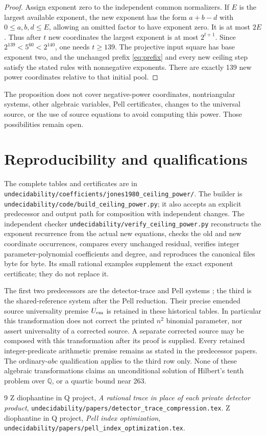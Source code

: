 \documentclass[11pt]{article}
\newcommand{\Q}{\mathbb Q}
\begin{document}
\begin{proof}
Assign exponent zero to the independent common normalizers.
If $E$ is the largest available exponent, the new exponent has the
form $a+b-d$ with $0\le a,b,d\le E$, allowing an omitted factor
to have exponent zero.  It is at most $2E$.  Thus after $t$ new
coordinates the largest exponent is at most $2^{t+1}$.  Since
$2^{139}<5^{60}<2^{140}$, one needs $t\ge139$.
The projective input square has base exponent two, and the unchanged
prefix \eqref{eq:prefix} and every new ceiling step satisfy the stated
rules with nonnegative exponents.  There are exactly 139 new power
coordinates relative to that initial pool.
\end{proof}

The proposition does not cover negative-power coordinates, nontriangular
systems, other algebraic variables, Pell certificates, changes to the
universal source, or the use of source equations to avoid computing this
power.  Those possibilities remain open.

\section{Reproducibility and qualifications}

The complete tables and certificates are in
\nolinkurl{undecidability/coefficients/jones1980_ceiling_power/}.
The builder is
\nolinkurl{undecidability/code/build_ceiling_power.py}; it also accepts
an explicit predecessor and output path for composition with independent
changes.  The independent checker
\nolinkurl{undecidability/verify_ceiling_power.py} reconstructs the exponent
recurrence from the actual new equations, checks the old and new
coordinate occurrences, compares every unchanged residual, verifies
integer parameter-polynomial coefficients and degree, and reproduces
the canonical files byte for byte.  Its small rational examples supplement
the exact exponent certificate; they do not replace it.

The first two predecessors are the detector-trace and Pell systems
\cite{detector,pell}; the third is the shared-reference system after
the Pell reduction.  Their precise emended source universality premise
$U_{\rm em}$ is retained in these historical tables.  In particular this
transformation does not correct the printed $n^2$ binomial parameter,
nor assert universality of a corrected source.  A separate corrected
source may be composed with this transformation after its proof is
supplied.  Every retained integer-predicate arithmetic premise remains
as stated in the predecessor papers.  The ordinary-$abc$ qualification
applies to the third row only.  None of these algebraic transformations
claims an unconditional solution of Hilbert's tenth problem over $\Q$,
or a quartic bound near 263.

\begin{thebibliography}{9}
 Z diophantine in Q project,
\emph{A rational trace in place of each private detector product},
\nolinkurl{undecidability/papers/detector_trace_compression.tex}.
 Z diophantine in Q project,
\emph{Pell index optimization},
\nolinkurl{undecidability/papers/pell_index_optimization.tex}.
\end{thebibliography}
\end{document}
